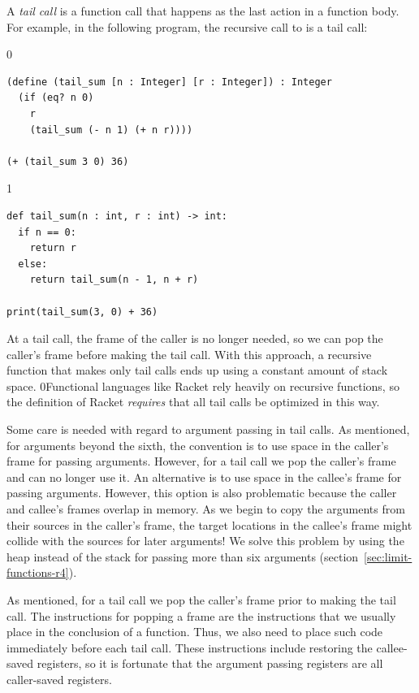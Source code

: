 \documentclass[7x10]{TimesAPriori_MIT}%
\def\racketEd{0}
\def\pythonEd{1}
\def\edition{1}
\newcommand{\racket}[1]{{\if\edition\racketEd{#1}\fi}}
\newcommand{\pythonColor}[0]{}
\numberwithin{theorem}{chapter}
\numberwithin{definition}{chapter}
\numberwithin{equation}{chapter}
\begin{document}
A \emph{tail call} is a function call that
happens as the last action in a function body.  For example, in the
following program, the recursive call to  is a tail
call:
\begin{center}
{\if\edition\racketEd  
\begin{lstlisting}
(define (tail_sum [n : Integer] [r : Integer]) : Integer
  (if (eq? n 0) 
    r
    (tail_sum (- n 1) (+ n r))))

(+ (tail_sum 3 0) 36)
\end{lstlisting}
\fi}
{\if\edition\pythonEd\pythonColor
\begin{lstlisting}
def tail_sum(n : int, r : int) -> int:
  if n == 0:
    return r
  else:
    return tail_sum(n - 1, n + r)

print(tail_sum(3, 0) + 36)
\end{lstlisting}
\fi}
\end{center}
At a tail call, the frame of the caller is no longer needed, so we can
pop the caller's frame before making the tail
call.  With this approach, a recursive function
that makes only tail calls ends up using a constant amount of stack
space.  \racket{Functional languages like Racket rely heavily on
  recursive functions, so the definition of Racket \emph{requires}
  that all tail calls be optimized in this way.}

Some care is needed with regard to argument passing in tail calls.  As
mentioned, for arguments beyond the sixth, the convention is to use
space in the caller's frame for passing arguments.  However, for a
tail call we pop the caller's frame and can no longer use it.  An
alternative is to use space in the callee's frame for passing
arguments. However, this option is also problematic because the caller
and callee's frames overlap in memory.  As we begin to copy the
arguments from their sources in the caller's frame, the target
locations in the callee's frame might collide with the sources for
later arguments! We solve this problem by using the heap instead of
the stack for passing more than six arguments
(section~\ref{sec:limit-functions-r4}).

As mentioned, for a tail call we pop the caller's frame prior to
making the tail call. The instructions for popping a frame are the
instructions that we usually place in the conclusion of a
function. Thus, we also need to place such code immediately before
each tail call. These instructions include restoring the callee-saved
registers, so it is fortunate that the argument passing registers are
all caller-saved registers.
\end{document}
